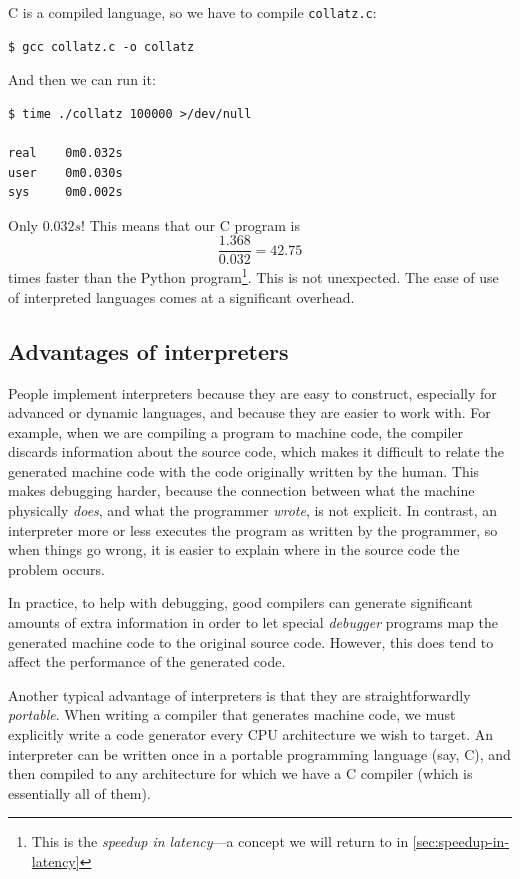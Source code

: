 C is a compiled language, so we have to compile \texttt{collatz.c}:

\begin{lstlisting}
$ gcc collatz.c -o collatz
\end{lstlisting}

And then we can run it:

\begin{lstlisting}
$ time ./collatz 100000 >/dev/null

real    0m0.032s
user    0m0.030s
sys     0m0.002s
\end{lstlisting}

Only $0.032s$!  This means that our C program is
\[
  \frac{1.368}{0.032} = 42.75
\]
times faster than the Python program\footnote{This is the
  \emph{speedup in latency}---a concept we will return to in
  \cref{sec:speedup-in-latency}}.  This is not unexpected.  The ease
of use of interpreted languages comes at a significant overhead.

\subsection{Advantages of interpreters}

People implement interpreters because they are easy to construct,
especially for advanced or dynamic languages, and because they are
easier to work with.  For example, when we are compiling a program to
machine code, the compiler discards information about the source code,
which makes it difficult to relate the generated machine code with the
code originally written by the human.  This makes debugging harder,
because the connection between what the machine physically
\textit{does}, and what the programmer \textit{wrote}, is not
explicit.  In contrast, an interpreter more or less executes the
program as written by the programmer, so when things go wrong, it is
easier to explain where in the source code the problem occurs.

In practice, to help with debugging, good compilers can generate
significant amounts of extra information in order to let special
\textit{debugger} programs map the generated machine code to the
original source code.  However, this does tend to affect the
performance of the generated code.

Another typical advantage of interpreters is that they are
straightforwardly \textit{portable}.  When writing a compiler that
generates machine code, we must explicitly write a code generator
every CPU architecture we wish to target.  An interpreter can be
written once in a portable programming language (say, C), and then
compiled to any architecture for which we have a C compiler (which is
essentially all of them).

